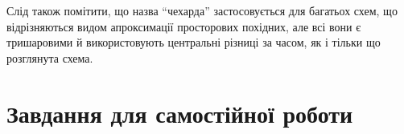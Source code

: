 Слід також помітити, що назва ``чехарда'' застосовується для багатьох схем, що відрізняються видом апроксимації просторових похідних, але всі вони є тришаровими й використовують центральні різниці за часом, як і тільки що розглянута схема.

\section{Завдання для самостійної роботи}

